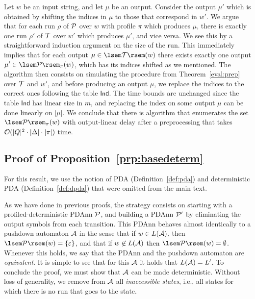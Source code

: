 Let $w$ be an input string, and let $\mu$ be an output. Consider the output $\mu'$ which is obtained by shifting the indices in $\mu$ to those that correspond in $w'$. We argue that for each run $\rho$ of $\mathcal{P}$ over $w$ with profile $\pi$ which produces $\mu$, there is exactly one run $\rho'$ of $\mathcal{T}$ over $w'$ which produces $\mu'$, and vice versa. We see this by a straightforward induction argument on the size of the run. This immediately implies that for each output $\mu\in\sem{\cT}(w)$ there exists exactly one output $\mu'\in\sem{\cP}_{\pi}(w)$, which has its indices shifted as we mentioned.
The algorithm then consists on simulating the procedure from Theorem~\ref{eval:prep} over $\mathcal{T}$ and $w'$, and before producing an output $\mu$, we replace the indices to the correct ones following the table  $\mathsf{Ind}$. The time bounds are unchanged since the table $\mathsf{Ind}$ has linear size in $m$, and replacing the index on some output $\mu$ can be done linearly on $|\mu|$. We conclude that there is algorithm that enumerates the set $\sem{\cP}_{\pi}(w)$ with output-linear delay after a preprocessing that takes $\mathcal{O}(|Q|^2\cdot \vert\Delta\vert\cdot |\pi|)$ time.

\subsection{Proof of Proposition~\ref{prp:basedeterm}}

%
%
%

For this result, we use the notion of PDA (Definition~\ref{def:pda}) and
deterministic PDA (Definition~\ref{def:dpda}) that were omitted from the main
text.

As we have done in previous proofs, the strategy consists on starting with a profiled-deterministic PDAnn $\mathcal{P}$, and building a PDAnn $\mathcal{P}'$ by eliminating the output symbols from each transition. This PDAnn behaves almost identically to a pushdown automaton $\mathcal{A}$ in the sense that if $w\in L(\mathcal{A})$,  then $\sem{\cP}(w) = \{\eps\}$, and that if $w\not\in L(\mathcal{A})$ then $\sem{\cP}(w) = \emptyset$. Whenever this holds, we say that the PDAnn and the pushdown automaton are \emph{equivalent}. It is simple to see that for this $\mathcal{A}$ it holds that $L(\mathcal{A}) = L'$. To conclude the proof, we must show that $\mathcal{A}$ can be made deterministic. Without loss of generality, we remove from $\mathcal{A}$ 
%
all \emph{inaccessible states}, i.e., all states for which there is no run that goes to the state.

